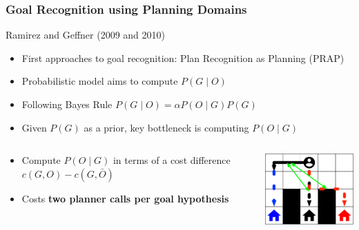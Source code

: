 \documentclass[usenames,dvipsnames]{beamer}
\begin{document}
\begin{frame}[c,allowframebreaks]\frametitle{Goal Recognition using Planning Domains}
	
	Ramirez and Geffner (2009 and 2010)
	\begin{itemize}
		\item First approaches to goal recognition: Plan Recognition as Planning (PRAP)
		\item Probabilistic model aims to compute $P(G \mid O)$
		\item Following Bayes Rule $P(G \mid O) = \alpha P(O \mid G) P(G)$
		\item Given $P(G)$ as a prior, key bottleneck is computing $P(O \mid G)$
	\end{itemize}
	\begin{columns}
		\begin{column}{.5\textwidth}
			\begin{itemize}
				\normalsize
				\item Compute $P(O \mid G)$ in terms of a cost difference $c(G,O) - c(G,\bar{O})$
				\item Costs \textbf{two planner calls per goal hypothesis}
			\end{itemize}
		\end{column}
		\begin{column}{.5\textwidth}
			\begin{center}
				\includegraphics[width=12em]{fig/gr-approaches/gr-ramirez.pdf}
			\end{center}
		\end{column}
	\end{columns}
	\framebreak


\end{frame}
\end{document}
